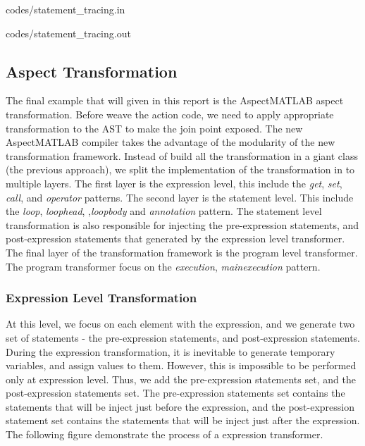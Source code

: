 \documentclass{comp621}
\begin{document}
\begin{multicols}{2}

                {codes/statement_tracing.in}
\columnbreak

                {codes/statement_tracing.out}    
\end{multicols}

\subsection{Aspect Transformation}
The final example that will given in this report is the AspectMATLAB aspect
transformation. Before weave the action code, we need to apply appropriate
transformation to the AST to make the join point exposed. The new AspectMATLAB
compiler takes the advantage of the modularity of the new transformation
framework. Instead of build all the transformation in a giant class (the
previous approach), we split the implementation of the transformation in to
multiple layers. The first layer is the expression level, this include the
\emph{get}, \emph{set}, \emph{call}, and \emph{operator} patterns. The second
layer is the statement level. This include the \emph{loop}, \emph{loophead},
,\emph{loopbody} and \emph{annotation} pattern. The statement level
transformation is also responsible for injecting the pre-expression statements,
and post-expression statements that generated by the expression level
transformer. The final layer of the transformation framework is the program
level transformer. The program transformer focus on the \emph{execution},
\emph{mainexecution} pattern.

\subsubsection{Expression Level Transformation}
At this level, we focus on each element with the expression, and we generate
two set of statements - the pre-expression statements, and post-expression
statements. During the expression transformation, it is inevitable to generate
temporary variables, and assign values to them. However, this is impossible to
be performed only at expression level. Thus, we add the pre-expression
statements set, and the post-expression statements set. The pre-expression
statements set contains the statements that will be inject just before the
expression, and the post-expression statement set contains the statements that
will be inject just after the expression. The following figure demonstrate the
process of a expression transformer.
\end{document}
